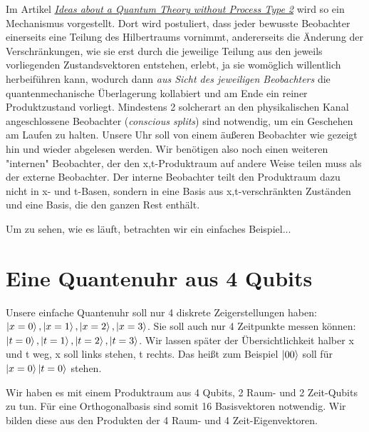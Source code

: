 \documentclass[12pt]{article}
\begin{document}
Im Artikel \emph{\href{https://docs.google.com/document/d/1OrmVETmnBSe5c0CpTbKH8Vq5pWFuB8QUez-KqHTaarQ/edit?usp=sharing}{Ideas about a Quantum Theory without Process Type 2}} wird so ein Mechanismus vorgestellt. Dort wird postuliert, dass jeder bewusste Beobachter einerseits eine Teilung des Hilbertraums vornimmt, andererseits die Änderung der Verschränkungen, wie sie erst durch die jeweilige Teilung aus den jeweils vorliegenden Zustandsvektoren entstehen, erlebt, ja sie womöglich willentlich herbeiführen kann, wodurch dann \emph{aus Sicht des jeweiligen Beobachters} die quantenmechanische Überlagerung kollabiert und am Ende ein reiner Produktzustand vorliegt. Mindestens 2 solcherart an den physikalischen Kanal angeschlossene Beobachter (\emph{conscious splits}) sind notwendig, um ein Geschehen am Laufen zu halten. Unsere Uhr soll von einem äußeren Beobachter wie gezeigt hin und wieder abgelesen werden. Wir benötigen also noch einen weiteren "internen" Beobachter, der den x,t-Produktraum auf andere Weise teilen muss als der externe Beobachter. Der interne Beobachter teilt den Produktraum dazu nicht in x- und t-Basen, sondern in eine Basis aus x,t-verschränkten Zuständen und eine Basis, die den ganzen Rest enthält.

Um zu sehen, wie es läuft, betrachten wir ein einfaches Beispiel...

\section{Eine Quantenuhr aus 4 Qubits}

Unsere einfache Quantenuhr soll nur 4 diskrete Zeigerstellungen haben: $\ket{x=0}, \ket{x=1}, \ket{x=2}, \ket{x=3}$. Sie soll auch nur 4 Zeitpunkte messen können: $\ket{t=0}, \ket{t=1}, \ket{t=2}, \ket{t=3}$. Wir lassen später der Übersichtlichkeit halber x und t weg, x soll links stehen, t rechts. Das heißt zum Beispiel $\ket{00}$ soll für $\ket{x=0}\ket{t=0}$ stehen. 

Wir haben es mit einem Produktraum aus 4 Qubits, 2 Raum- und 2 Zeit-Qubits zu tun. Für eine Orthogonalbasis sind somit 16 Basisvektoren notwendig. Wir bilden diese aus den Produkten der 4 Raum- und 4 Zeit-Eigenvektoren.
\end{document}
